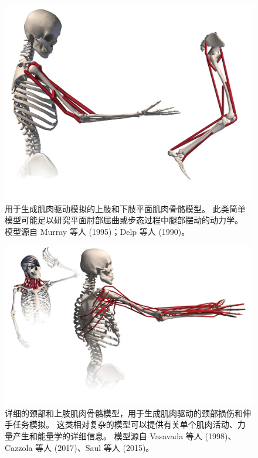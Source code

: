 \begin{figure}[!htb]
	\centering
	\includegraphics[width=1.0\linewidth]{chap10/10_5}
	\caption{用于生成肌肉驱动模拟的上肢和下肢平面肌肉骨骼模型。
		此类简单模型可能足以研究平面肘部屈曲或步态过程中腿部摆动的动力学。
		模型源自 Murray 等人 (1995)；Delp 等人 (1990)。 \label{fig:10_5}}
\end{figure}


\begin{figure}[!htb]
	\centering
	\includegraphics[width=1.0\linewidth]{chap10/10_6}
	\caption{详细的颈部和上肢肌肉骨骼模型，用于生成肌肉驱动的颈部损伤和伸手任务模拟。
		这类相对复杂的模型可以提供有关单个肌肉活动、力量产生和能量学的详细信息。
		模型源自 Vasavada 等人 (1998)、Cazzola 等人 (2017)、Saul 等人 (2015)。 \label{fig:10_6}}
\end{figure}


